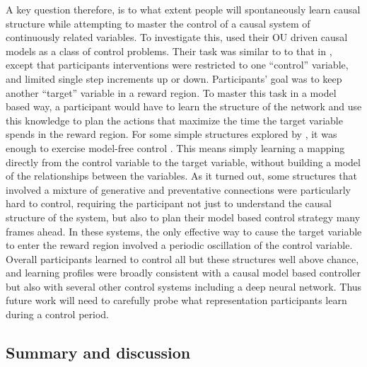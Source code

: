 \documentclass{cambridge7A}%
\begin{document}
A key question therefore, is to what extent people will spontaneously learn causal structure while attempting to master the control of a causal system of continuously related variables.  To investigate this, \cite{davis2018control} used their OU driven causal models as a class of control problems.   Their task was similar to to that in \cite{davis2018ctcv}, except that participants interventions were restricted to one ``control'' variable, and limited single step increments up or down.  Participants' goal was to keep another ``target'' variable in a reward region.  To master this task in a model based way, a participant would have to learn the structure of the network and use this knowledge to plan the actions that maximize the time the target variable spends in the reward region.  For some simple structures explored by \cite{davis2018control}, it was enough to exercise model-free control  \citep{dayan2014model}.  This means simply learning a mapping directly from the control variable to the target variable, without building a model of the relationships between the variables.  As it turned out, some structures that involved a mixture of generative and preventative connections were particularly hard to control, requiring the participant not just to understand the causal structure of the system, but also to plan their model based control strategy many frames ahead.  In these systems, the only effective way to cause the target variable to enter the reward region involved a periodic oscillation of the control variable.  Overall participants learned to control all but these structures well above chance, and learning profiles were broadly consistent with a causal model based controller but also with several other control systems including a deep neural network.  Thus future work will need to carefully probe what representation participants learn during a control period.  %


\subsection{Summary and discussion}
\end{document}
